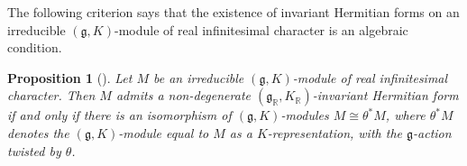 \documentclass[11pt, a4paper]{amsart}
\newcommand{\fg}{\mathfrak{g}}
\newcommand{\fu}{\mathfrak{u}}
\newcommand{\R}{\mathbb{R}}
\newtheorem{Prop}[Thm]{Proposition}
\theoremstyle{definition}
\numberwithin{equation}{section}
\begin{document}
The following criterion says that the existence of invariant Hermitian forms on an irreducible $(\fg,K)$-module of real infinitesimal character is an algebraic condition.

\begin{Prop}[\cite{ALTV}] \label{prop:Hermitian}
	Let $M$ be an irreducible $(\fg,K)$-module of real infinitesimal character. Then $M$ admits a non-degenerate $(\fg_\R,K_\R)$-invariant Hermitian form if and only if there is an isomorphism of $(\fg,K)$-modules $M \cong \theta^*M$, where $\theta^*M$ denotes the $(\fg,K)$-module equal to $M$ as a $K$-representation, with the $\fg$-action twisted by $\theta$.
\end{Prop}

\end{document}
